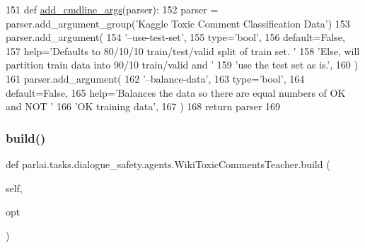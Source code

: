 \begin{DoxyCode}
151     \textcolor{keyword}{def }\hyperlink{namespaceparlai_1_1agents_1_1drqa_1_1config_a62fdd5554f1da6be0cba185271058320}{add\_cmdline\_args}(parser):
152         parser = parser.add\_argument\_group(\textcolor{stringliteral}{'Kaggle Toxic Comment Classification Data'})
153         parser.add\_argument(
154             \textcolor{stringliteral}{'--use-test-set'},
155             type=\textcolor{stringliteral}{'bool'},
156             default=\textcolor{keyword}{False},
157             help=\textcolor{stringliteral}{'Defaults to 80/10/10 train/test/valid split of train set. '}
158             \textcolor{stringliteral}{'Else, will partition train data into 90/10 train/valid and '}
159             \textcolor{stringliteral}{'use the test set as is.'},
160         )
161         parser.add\_argument(
162             \textcolor{stringliteral}{'--balance-data'},
163             type=\textcolor{stringliteral}{'bool'},
164             default=\textcolor{keyword}{False},
165             help=\textcolor{stringliteral}{'Balances the data so there are equal numbers of OK and NOT '}
166             \textcolor{stringliteral}{'OK training data'},
167         )
168         \textcolor{keywordflow}{return} parser
169 
\end{DoxyCode}
\mbox{\label{classparlai_1_1tasks_1_1dialogue__safety_1_1agents_1_1WikiToxicCommentsTeacher_acbc5c579a2791af831f6e4f72dc8560c}} 
\subsubsection{\texorpdfstring{build()}{build()}}
{\footnotesize\ttfamily def parlai.\+tasks.\+dialogue\+\_\+safety.\+agents.\+Wiki\+Toxic\+Comments\+Teacher.\+build (\begin{DoxyParamCaption}\item[{}]{self,  }\item[{}]{opt }\end{DoxyParamCaption})}



